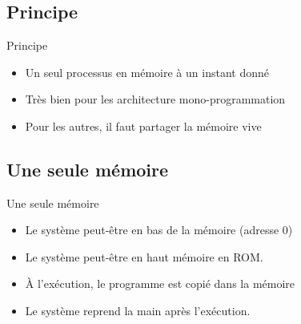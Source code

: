 \section{\sectitle}
\begin{frame}{\sectitle}
    \def\subsectitle{Principe}
    \subsection{\subsectitle}
    \begin{block}{\subsectitle}
        \begin{itemize}
            \item Un seul processus en mémoire à un instant donné
            \item Très bien pour les architecture mono-programmation
            \item Pour les autres, il faut partager la mémoire vive
        \end{itemize}
    \end{block}

    \def\subsectitle{Une seule mémoire}
    \subsection{\subsectitle}
    \begin{block}{\subsectitle}
        \begin{itemize}
            \item Le système peut-être en bas de la mémoire (adresse 0)
            \item Le système peut-être en haut mémoire en ROM.
            \item À l'exécution, le programme est copié dans la mémoire
            \item Le système reprend la main après l'exécution.
        \end{itemize}
    \end{block}
\end{frame}


\def\sectitle{Partitions fixes}
